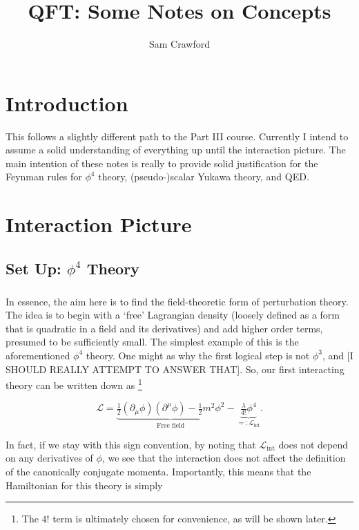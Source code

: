\documentclass[12pt]{report}
\begin{document}
\title{QFT: Some Notes on Concepts}
\author{Sam Crawford}
\maketitle
\chapter{Introduction}
This follows a slightly different path to the Part III course. Currently I intend to assume a solid understanding of everything up until the interaction picture. The main intention of these notes is really to provide solid justification for the Feynman rules for $\phi^4$ theory, (pseudo-)scalar Yukawa theory, and QED.


\chapter{Interaction Picture}

\section{Set Up: $\phi^4$ Theory}

\paragraph{}In essence, the aim here is to find the field-theoretic form of perturbation theory. The idea is to begin with a `free' Lagrangian density (loosely defined as a form that is quadratic in a field and its derivatives) and add higher order terms, presumed to be sufficiently small. The simplest example of this is the aforementioned $\phi^4$ theory. One might as why the first logical step is not $\phi^3$, and [I SHOULD REALLY ATTEMPT TO ANSWER THAT]. So, our first interacting theory can be written down as \footnote{The $4!$ term is ultimately chosen for convenience, as will be shown later.}

	\begin{equation}
		\mathcal{L} = \underbrace{\tfrac{1}{2} \left( \partial_\mu \phi \right) \left( \partial^\mu \phi \right) - \tfrac{1}{2} m^2 \phi^2}_{\text{Free field}} - \underbrace{\tfrac{\lambda}{4!} \phi^4}_{=: \mathcal{L}_{\text{int}}}.
	\end{equation}

In fact, if we stay with this sign convention, by noting that $\mathcal{L}_{\text{int}}$ does not depend on any derivatives of $\phi$, we see that the interaction does not affect the definition of the canonically conjugate momenta. Importantly, this means that the Hamiltonian for this theory is simply
\end{document}
